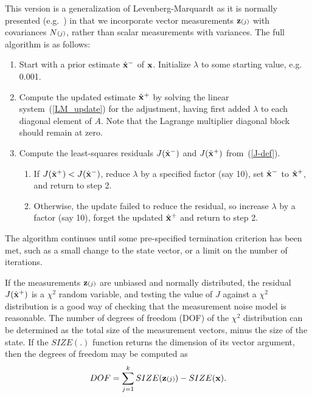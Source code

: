 This version is a generalization
of Levenberg-Marquardt as it is normally presented
(e.g.~\cite{Press:etal:88}) in that we incorporate vector measurements
${\bf z}{\scriptstyle (j)}$ with covariances $N{\scriptstyle (j)}$, rather than scalar measurements
with variances. The full algorithm is as follows:
\begin{enumerate}
 \item Start with a prior estimate $\hat{\bf x}^-$ of ${\bf x}$. Initialize $\lambda$
        to some starting value, e.g. 0.001.
 \item Compute the updated estimate $\hat{\bf x}^+$ by solving the linear
        system~(\ref{LM_update}) for the adjustment, having first added
        $\lambda$ to each diagonal element of $A$. Note that the Lagrange
        multiplier diagonal block should remain at zero.
 \item Compute the least-squares residuals $J(\hat{\bf x}^-)$ and $J(\hat{\bf x}^+)$
        from~(\ref{J-def}).
 \begin{enumerate}
  \item If $J(\hat{\bf x}^+)<J(\hat{\bf x}^-)$, reduce $\lambda$ by a specified factor
        (say 10), set $\hat{\bf x}^-$ to $\hat{\bf x}^+$, and return to step 2.
  \item Otherwise, the update failed to reduce the residual, so increase
        $\lambda$ by a factor (say 10), forget the updated $\hat{\bf x}^+$ and
        return to step 2.
 \end{enumerate}
\end{enumerate}
The algorithm continues until some pre-specified termination criterion
has been met, such as a small change to the state vector, or a limit on
the number of iterations.

If the measurements ${\bf z}{\scriptstyle (j)}$ are unbiased and normally distributed,
the residual $J(\hat{\bf x}^+)$ is a $\chi^2$ random variable, and testing
the value of $J$ against a $\chi^2$ distribution is a good way
of checking that the measurement noise model is reasonable.
The number of degrees of freedom (DOF) of the $\chi^2$ distribution
can be determined as the total size of the measurement vectors,
minus the size of the state.
If the $SIZE(.)$ function returns the dimension of its vector
argument, then the degrees of freedom may be computed as
\begin{equation}
 DOF = \sum_{j=1}^k SIZE({\bf z}{\scriptstyle (j)}) - SIZE({\bf x}).
 \label{LM_DOF}
\end{equation}

